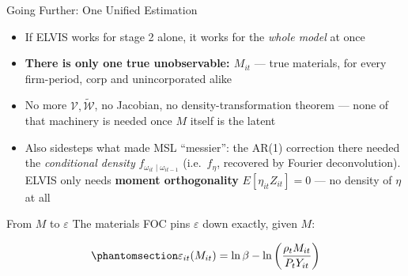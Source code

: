 \documentclass[
  ignorenonframetext,
  aspectratio=169,
]{beamer}
\newcounter{none} %
\providecommand{\tightlist}{%
  \setlength{\itemsep}{0pt}\setlength{\parskip}{0pt}}
\begin{document}
\begin{frame}{Going Further: One Unified Estimation}
\protect{}\label{going-further-one-unified-estimation}
\begin{itemize}
\tightlist
\item
  If ELVIS works for stage 2 alone, it works for the \emph{whole model}
  at once
\item
  \textbf{There is only one true unobservable: \(M_{it}\)} --- true
  materials, for every firm-period, corp and unincorporated alike
\item
  No more \(\mathcal V,\tilde{\mathcal W}\), no Jacobian, no
  density-transformation theorem --- none of that machinery is needed
  once \(M\) itself is the latent
\item
  Also sidesteps what made MSL ``messier'': the AR(1) correction there
  needed the \emph{conditional density}
  \(f_{\omega_{it}\mid\omega_{it-1}}\) (i.e.~\(f_\eta\), recovered by
  Fourier deconvolution). ELVIS only needs \textbf{moment orthogonality}
  \(E[\eta_{it}Z_{it}]=0\) --- no density of \(\eta\) at all
\end{itemize}
\end{frame}

\begin{frame}{From \(M\) to \(\varepsilon\)}
\protect{}\label{from-m-to-varepsilon}
The materials FOC pins \(\varepsilon\) down exactly, given \(M\):

\begin{equation}\protect\phantomsection\label{eq-full-eps}{
\varepsilon_{it}(M_{it}) = \ln\beta-\ln\left(\frac{\rho_tM_{it}}{P_tY_{it}}\right)
}\end{equation}
\end{frame}
\end{document}
